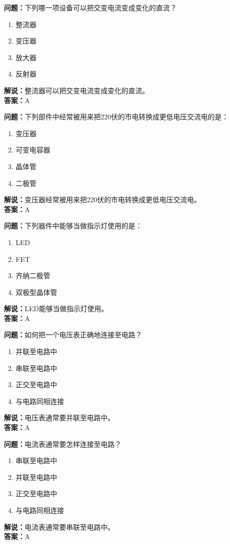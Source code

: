 \documentclass{ctexbook}%
\begin{document}
\textbf{问题：}下列哪一项设备可以把交变电流变成变化的直流？
\begin{enumerate}[label=\Alph*), leftmargin=3em]
\item 整流器
\item 变压器
\item 放大器
\item 反射器
\end{enumerate}
\textbf{解说：}整流器可以把交变电流变成变化的直流。\\
\textbf{答案：}A

\textbf{问题：}下列部件中经常被用来把220伏的市电转换成更低电压交流电的是：
\begin{enumerate}[label=\Alph*), leftmargin=3em]
\item 变压器
\item 可变电容器
\item 晶体管
\item 二极管
\end{enumerate}
\textbf{解说：}变压器经常被用来把220伏的市电转换成更低电压交流电。\\
\textbf{答案：}A

\textbf{问题：}下列器件中能够当做指示灯使用的是：
\begin{enumerate}[label=\Alph*), leftmargin=3em]
\item LED
\item FET
\item 齐纳二极管
\item 双极型晶体管
\end{enumerate}
\textbf{解说：}LED能够当做指示灯使用。\\
\textbf{答案：}A

\textbf{问题：}如何把一个电压表正确地连接至电路？
\begin{enumerate}[label=\Alph*), leftmargin=3em]
\item 并联至电路中
\item 串联至电路中
\item 正交至电路中
\item 与电路同相连接
\end{enumerate}
\textbf{解说：}电压表通常要并联至电路中。\\
\textbf{答案：}A

\textbf{问题：}电流表通常要怎样连接至电路？
\begin{enumerate}[label=\Alph*), leftmargin=3em]
\item 串联至电路中
\item 并联至电路中
\item 正交至电路中
\item 与电路同相连接
\end{enumerate}
\textbf{解说：}电流表通常要串联至电路中。\\
\textbf{答案：}A
\end{document}
